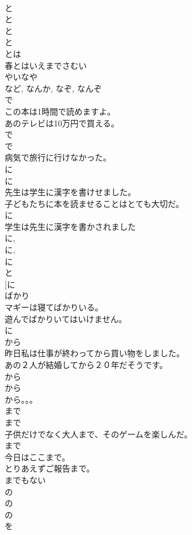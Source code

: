\documentclass[8pt]{extreport}
\begin{document}
\begin{CJK}{UTF8}{min}
\\	と 
\\	と 
\\	と 
\\	と 
\\	とは 
\\	春とはいえまでさむい 
\\	やいなや 
\\	など, なんか, なぞ, なんぞ	
\\	で	
\\	この本は1時間で読めますよ。
\\	あのテレビは10万円で買える。
\\	で	
\\	で	
\\	病気で旅行に行けなかった。
\\	に 
\\	に 
\\	先生は学生に漢字を書けせました。
\\	子どもたちに本を読ませることはとても大切だ。
\\	に 
\\	学生は先生に漢字を書かされました 
\\	に, 
\\	に, 
\\	に	
\\	と 
\\	[に 
\\	ばかり	
\\	マギーは寝てばかりいる。 
\\	遊んでばかりいてはいけません。 
\\	に 
\\	から 
\\	昨日私は仕事が終わってから買い物をしました。
\\	あの２人が結婚してから２０年だそうです。
\\	から 
\\	から 
\\	から。。。
\\	まで 
\\	まで 
\\	子供だけでなく大人まで、そのゲームを楽しんだ。
\\	まで 
\\	今日はここまで。
\\	とりあえずご報告まで。
\\	までもない	
\\	の 
\\	の 
\\	の 
\\	を 

\end{CJK}
\end{document}
